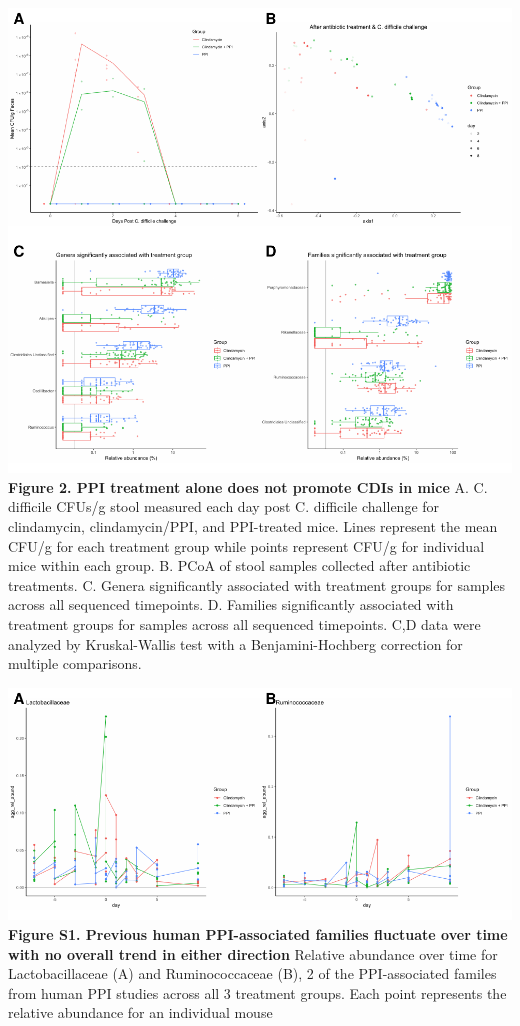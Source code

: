\documentclass[11pt,]{article}
\begin{document}
\newpage

\includegraphics{figure_2.pdf} \textbf{Figure 2. PPI treatment alone
does not promote CDIs in mice} A. C. difficile CFUs/g stool measured
each day post C. difficile challenge for clindamycin, clindamycin/PPI,
and PPI-treated mice. Lines represent the mean CFU/g for each treatment
group while points represent CFU/g for individual mice within each
group. B. PCoA of stool samples collected after antibiotic treatments.
C. Genera significantly associated with treatment groups for samples
across all sequenced timepoints. D. Families significantly associated
with treatment groups for samples across all sequenced timepoints. C,D
data were analyzed by Kruskal-Wallis test with a Benjamini-Hochberg
correction for multiple comparisons.

\newpage

\includegraphics{figure_s1.pdf} \textbf{Figure S1. Previous human
PPI-associated families fluctuate over time with no overall trend in
either direction} Relative abundance over time for Lactobacillaceae (A)
and Ruminococcaceae (B), 2 of the PPI-associated familes from human PPI
studies across all 3 treatment groups. Each point represents the
relative abundance for an individual mouse
\end{document}
